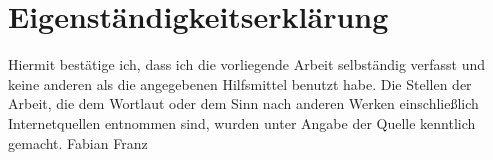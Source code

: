 \documentclass{article}
\numberwithin{equation}{section}
\begin{document}
\section{Eigenständigkeitserklärung}
Hiermit bestätige ich, dass ich die vorliegende Arbeit selbständig verfasst und keine 
anderen als die angegebenen Hilfsmittel benutzt habe. Die Stellen der Arbeit, die dem 
Wortlaut oder dem Sinn nach anderen Werken einschließlich Internetquellen entnommen sind, 
wurden unter Angabe der Quelle kenntlich gemacht.
\linebreak
\linebreak
\linebreak
\linebreak
Fabian Franz
\end{document}
